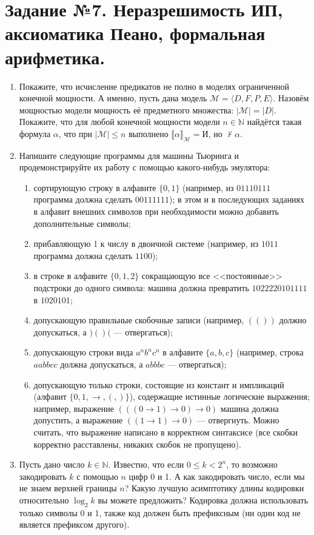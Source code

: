 \documentclass[10pt,a4paper,oneside]{article}
\begin{document}
\section*{Задание №7. Неразрешимость ИП, аксиоматика Пеано, формальная арифметика.}
\begin{enumerate}
\item Покажите, что исчисление предикатов не полно в моделях ограниченной конечной мощности. 
А именно, пусть дана модель $\mathcal{M} = \langle D, F, P, E \rangle$. 
Назовём мощностью модели мощность её предметного множества: $|\mathcal{M}| = |D|$.
Покажите, что для любой конечной мощности модели $n\in\mathbb{N}$ найдётся такая формула $\alpha$, что 
при $|\mathcal{M}|\le n$ выполнено $\llbracket\alpha\rrbracket_\mathcal{M} = \text{И}$, но $\not\vdash\alpha$.

\item Напишите следующие программы для машины Тьюринга и продемонстрируйте их работу с помощью какого-нибудь эмулятора:
\begin{enumerate}
\item сортирующую строку в алфавите $\{0,1\}$ (например, из $01110111$ программа должна сделать $00111111$);
в этом и в последующих заданиях в алфавит внешних символов при необходимости можно добавить дополнительные символы;
\item прибавляющую 1 к числу в двоичной системе (например, из $1011$ программа должна сделать $1100$);
\item в строке в алфавите $\{0,1,2\}$ сокращающую все <<постоянные>> подстроки до одного символа:
машина должна превратить $1022220101111$ в $1020101$;
\item допускающую правильные скобочные записи (например, $(())$ должно допускаться, а $)()($ --- отвергаться);
\item допускающую строки вида $a^nb^nc^n$ в алфавите $\{a,b,c\}$ (например, строка $aabbcc$ должна допускаться, а $abbbc$ --- отвергаться);
\item допускающую только строки, состоящие из констант и импликаций (алфавит $\{ 0, 1, \rightarrow, (, ) \}$), 
содержащие истинные логические выражения;
например, выражение $(((0 \rightarrow 1) \rightarrow 0) \rightarrow 0)$ машина должна допустить, а
выражение $((1 \rightarrow 1) \rightarrow 0)$ --- отвергнуть. Можно считать, что выражение написано в корректном синтаксисе (все скобки корректно
расставлены, никаких скобок не пропущено).
\end{enumerate}

\item Пусть дано число $k \in \mathbb{N}$. Известно, что если $0 \le k < 2^n$, то возможно закодировать $k$ с помощью $n$ цифр 0 и 1.
А как закодировать число, если мы не знаем верхней границы $n$? Какую лучшую асимптотику длины кодировки относительно $\log_2 k$ вы можете
предложить? Кодировка должна использовать только символы 0 и 1, также код должен быть префиксным (ни один код не является префиксом другого).


\end{enumerate}
\end{document}
